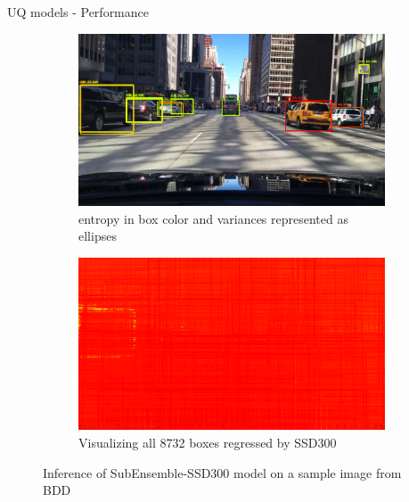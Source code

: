\documentclass[10pt, aspectratio=169]{beamer}
\begin{document}
\begin{frame}[allowframebreaks]{UQ models - Performance}
       \begin{figure}[H]
        \captionsetup[table]{skip=0pt}
           \centering
           \begin{subfigure}[t]{0.495\textwidth}
               \centering
               \includegraphics[width=\textwidth]{images/det_images/bdd_subens_entropies_0.png}
               \caption{entropy in box color and variances represented as ellipses}
           \end{subfigure}
           \begin{subfigure}[t]{0.495\textwidth}
               \centering
               \includegraphics[width=\textwidth]{images/det_images/all_subens_bdd_1.png}
               \caption{Visualizing all 8732 boxes regressed by SSD300}
           \end{subfigure}
           \caption{Inference of SubEnsemble-SSD300 model on a sample image from BDD}
       \end{figure}
    

\end{frame}
\end{document}
